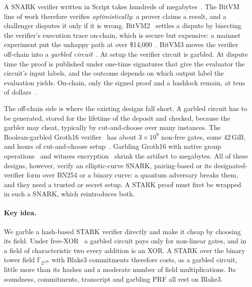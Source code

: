 \documentclass[11pt]{article}
\newcommand{\F}{\mathbb{F}_{2^{128}}}
\newcommand{\XOR}{\textsf{XOR}}
\begin{document}
A SNARK verifier written in Script takes hundreds of megabytes~\cite{babe2026}.
The BitVM line of work therefore verifies \emph{optimistically}: a prover claims
a result, and a challenger disputes it only if it is wrong.
BitVM2~\cite{laa25bitvm2} settles a dispute by bisecting the verifier's
execution trace on-chain, which is secure but expensive: a mainnet experiment
put the unhappy path at over \$14{,}000~\cite{babe2026}. BitVM3 moves the
verifier off-chain into a \emph{garbled circuit}~\cite{lin25bitvm3,bitvm3paper,che25sok}.
At setup the verifier circuit is garbled. At dispute time the proof is published
under one-time signatures that give the evaluator the circuit's input labels, and
the outcome depends on which output label the evaluation yields. On-chain, only
the signed proof and a hashlock remain, at tens of dollars~\cite{babe2026}.

The off-chain side is where the existing designs fall short. A garbled circuit
has to be generated, stored for the lifetime of the deposit and checked, because
the garbler may cheat, typically by cut-and-choose over many instances. The
Boolean-garbled Groth16 verifier~\cite{bit25b} has about $3\times10^9$ non-free
gates, some 42\,GiB, and hours of cut-and-choose setup~\cite{babe2026}. Garbling
Groth16 with native group operations~\cite{kflt26native} and witness
encryption~\cite{babe2026} shrink the artifact to megabytes. All of these
designs, however, verify an elliptic-curve SNARK, pairing-based or its
designated-verifier form over BN254 or a binary curve: a quantum adversary breaks
them, and they need a trusted or secret setup. A STARK proof must
first be wrapped in such a SNARK, which reintroduces both.

\paragraph{Key idea.} We garble a hash-based STARK verifier directly and make it
cheap by choosing its field. Under free-XOR~\cite{ks08} a garbled circuit pays
only for non-linear gates, and in a field of characteristic two every addition
is an \XOR. A STARK over the binary tower field $\F$ with Blake3 commitments
therefore costs, as a garbled circuit, little more than its hashes and a
moderate number of field multiplications. Its soundness, commitments, transcript
and garbling PRF all rest on Blake3.
\end{document}
